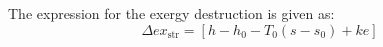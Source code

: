 The expression for the exergy destruction is given as:  
\[
\Delta ex_{\text{str}} = \left[ h - h_0 - T_0 (s - s_0) + ke \right]
\]